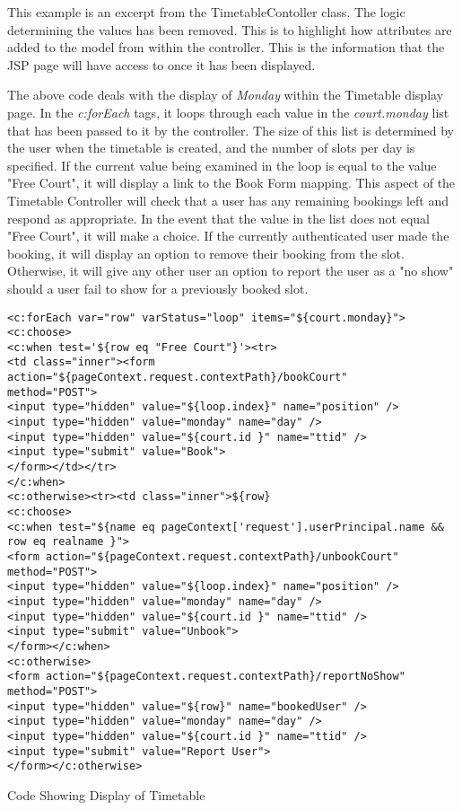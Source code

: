 This example is an excerpt from the TimetableContoller class. The logic determining the values has been removed. This is to highlight how attributes are added to the model from within the controller. This is the information that the JSP page will have access to once it has been displayed.

The above code deals with the display of \textit{Monday} within the Timetable display page. In the \textit{c:forEach} tags, it loops through each value in the \textit{court.monday} list that has been passed to it by the controller. The size of this list is determined by the user when the timetable is created, and the number of slots per day is specified. If the current value being examined in the loop is equal to the value "Free Court", it will display a link to the Book Form mapping. This aspect of the Timetable Controller will check that a user has any remaining bookings left and respond as appropriate. In the event that the value in the list does not equal "Free Court", it will make a choice. If the currently authenticated user made the booking, it will display an option to remove their booking from the slot. Otherwise, it will give any other user an option to report the user as a "no show" should a user fail to show for a previously booked slot. \newline

\begin{table}[H]
\begin{lstlisting}
<c:forEach var="row" varStatus="loop" items="${court.monday}">
<c:choose>
<c:when test='${row eq "Free Court"}'><tr>
<td class="inner"><form action="${pageContext.request.contextPath}/bookCourt"
method="POST">
<input type="hidden" value="${loop.index}" name="position" />
<input type="hidden" value="monday" name="day" /> 
<input type="hidden" value="${court.id }" name="ttid" />
<input type="submit" value="Book">
</form></td></tr>
</c:when>
<c:otherwise><tr><td class="inner">${row}
<c:choose>
<c:when test="${name eq pageContext['request'].userPrincipal.name && row eq realname }">
<form action="${pageContext.request.contextPath}/unbookCourt" method="POST">
<input type="hidden" value="${loop.index}" name="position" />
<input type="hidden" value="monday" name="day" /> 
<input type="hidden" value="${court.id }" name="ttid" /> 
<input type="submit" value="Unbook">
</form></c:when>
<c:otherwise>
<form action="${pageContext.request.contextPath}/reportNoShow" method="POST">
<input type="hidden" value="${row}" name="bookedUser" />
<input type="hidden" value="monday" name="day" /> 
<input type="hidden" value="${court.id }" name="ttid" /> 
<input type="submit" value="Report User">
</form></c:otherwise>
\end{lstlisting}
\caption{Code Showing Display of Timetable}
\end{table}


